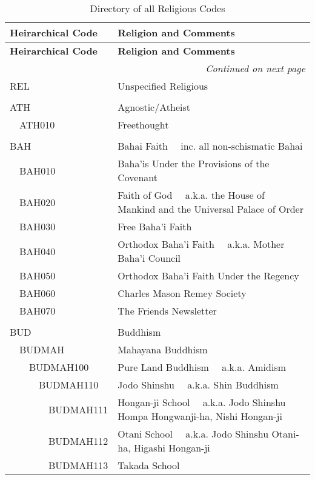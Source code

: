 \documentclass[12pt]{article}
\begin{document}
\begin{tiny}
\begin{center}
\begin{longtable}{|l|l|}
\caption{{\Large Directory of all Religious Codes} }
\label{tab:CAMEORCScodes}
\\ \cline{1-1} \cline{1-2}
\textbf{{\normalsize Heirarchical Code}} & \textbf{{\normalsize Religion and Comments }} \\
\hline
\endfirsthead
\hline
\textbf{{\normalsize Heirarchical Code }} & \textbf{{\normalsize Religion and Comments }} \\
\hline
\endhead
\hline
\multicolumn{2}{r}{\emph{Continued on next page}}
\endfoot
\hline
\endlastfoot
\\
{\normalsize REL } & {\normalsize  Unspecified Religious } \\
 \\
{\normalsize ATH } & {\normalsize Agnostic/Atheist } \\
~~ATH010 & Freethought \\
 \\
{\normalsize BAH } & {\normalsize Bahai Faith	~~inc. all non-schismatic Bahai } \\
~~BAH010 & Baha'is Under the Provisions of the Covenant \\
~~BAH020 & Faith of God	~~a.k.a. the House of Mankind and the Universal Palace of Order \\
~~BAH030 & Free Baha'i Faith \\
~~BAH040 & Orthodox Baha'i Faith	~~a.k.a. Mother Baha'i Council \\
~~BAH050 & Orthodox Baha'i Faith Under the Regency \\
~~BAH060 & Charles Mason Remey Society \\
~~BAH070 & The Friends Newsletter \\
 \\
{\normalsize BUD } & {\normalsize Buddhism } \\
~~BUDMAH & Mahayana Buddhism \\
~~~~BUDMAH100 & Pure Land Buddhism	~~a.k.a. Amidism \\
~~~~~~BUDMAH110 & Jodo Shinshu	~~a.k.a. Shin Buddhism \\
~~~~~~~~BUDMAH111 & Hongan-ji School	~~a.k.a. Jodo Shinshu Hompa Hongwanji-ha, Nishi Hongan-ji \\
~~~~~~~~BUDMAH112 & Otani School	~~a.k.a. Jodo Shinshu Otani-ha, Higashi Hongan-ji \\
~~~~~~~~BUDMAH113 & Takada School \\

\end{longtable}
\end{center}
\end{tiny}
\end{document}
